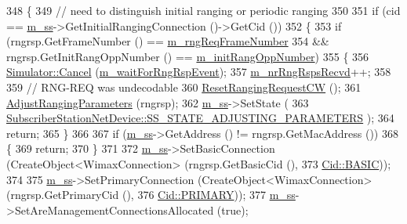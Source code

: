 \begin{DoxyCode}
348 \{
349   \textcolor{comment}{// need to distinguish initial ranging or periodic ranging}
350 
351   \textcolor{keywordflow}{if} (cid == \hyperlink{classns3_1_1SSLinkManager_a44506c63befdc33eb0e0b4ba7f93d498}{m\_ss}->GetInitialRangingConnection ()->GetCid ())
352     \{
353       \textcolor{keywordflow}{if} (rngrsp.GetFrameNumber () == \hyperlink{classns3_1_1SSLinkManager_aa1819c668290b52001071139ed22374a}{m\_rngReqFrameNumber}
354           && rngrsp.GetInitRangOppNumber () == \hyperlink{classns3_1_1SSLinkManager_a268da8bf334b79ef5d61926c7735cc3e}{m\_initRangOppNumber})
355         \{
356           \hyperlink{classns3_1_1Simulator_a1b903a62d6117ef28f7ba3c6500689bf}{Simulator::Cancel} (\hyperlink{classns3_1_1SSLinkManager_a6e94b74ad20fe217bf121b94deeca1ba}{m\_waitForRngRspEvent});
357           \hyperlink{classns3_1_1SSLinkManager_a52b9d5b8bc2d27a3ef604735ee731afc}{m\_nrRngRspsRecvd}++;
358 
359           \textcolor{comment}{// RNG-REQ was undecodable}
360           \hyperlink{classns3_1_1SSLinkManager_a9eb4c92a089cd9960bce5e24bba64ed1}{ResetRangingRequestCW} ();
361           \hyperlink{classns3_1_1SSLinkManager_a04e92e6521c11d279b3aff2ef73ce7d4}{AdjustRangingParameters} (rngrsp);
362           \hyperlink{classns3_1_1SSLinkManager_a44506c63befdc33eb0e0b4ba7f93d498}{m\_ss}->SetState (
363             \hyperlink{classns3_1_1SubscriberStationNetDevice_af9f145bc05df1f18610a3d4b61ff9ee4ab966447e17e355aff9bf29f0a92bd4a5}{SubscriberStationNetDevice::SS\_STATE\_ADJUSTING\_PARAMETERS}
      );
364           \textcolor{keywordflow}{return};
365         \}
366 
367       \textcolor{keywordflow}{if} (\hyperlink{classns3_1_1SSLinkManager_a44506c63befdc33eb0e0b4ba7f93d498}{m\_ss}->GetAddress () != rngrsp.GetMacAddress ())
368         \{
369           \textcolor{keywordflow}{return};
370         \}
371 
372       \hyperlink{classns3_1_1SSLinkManager_a44506c63befdc33eb0e0b4ba7f93d498}{m\_ss}->SetBasicConnection (CreateObject<WimaxConnection> (rngrsp.GetBasicCid (),
373                                                                \hyperlink{classns3_1_1Cid_a10b8f92080ca5790e65a0bfa2f557e0aa68b82b5b38abe3f2b40e5e3d950ac746}{Cid::BASIC}));
374 
375       \hyperlink{classns3_1_1SSLinkManager_a44506c63befdc33eb0e0b4ba7f93d498}{m\_ss}->SetPrimaryConnection (CreateObject<WimaxConnection> (rngrsp.GetPrimaryCid (),
376                                                                  \hyperlink{classns3_1_1Cid_a10b8f92080ca5790e65a0bfa2f557e0aa0ffb28b79686aa37c614c868e330418b}{Cid::PRIMARY}));
377       \hyperlink{classns3_1_1SSLinkManager_a44506c63befdc33eb0e0b4ba7f93d498}{m\_ss}->SetAreManagementConnectionsAllocated (\textcolor{keyword}{true});

\end{DoxyCode}
